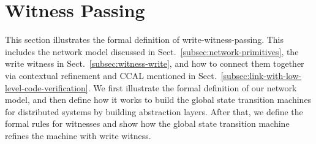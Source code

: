 \section{Witness Passing}
\label{sec:witness-passing-semantics}

This section illustrates the formal definition of write-witness-passing.
This includes
the network model discussed in Sect.~\ref{subsec:network-primitives}, 
the write witness in Sect.~\ref{subsec:witness-write}, and 
how to connect them together via contextual refinement and CCAL mentioned in Sect.~\ref{subsec:link-with-low-level-code-verification}.
We first illustrate the formal definition of our network model,  and then define how it works to 
build the global state transition machines for distributed systems by
building abstraction layers.
After that, we define the formal rules for witnesses and show how the global state transition machine refines
the machine with write witness. 

\newcommand{\msg}{\mathrm{msg}}
\newcommand{\argus}{\mathrm{args}}
\newcommand{\packet}{\mathrm{pkt}}
\newcommand{\canrecv}{\mathrm{valid_{recv}}}
\newcommand{\getsrc}{\mathrm{getSrc}}
\newcommand{\getowner}{\mathrm{getOwner}}
\newcommand{\getdes}{\mathrm{getDes}}
\newcommand{\checkcidone}{{\mathrm{checkCid}_1}}
\newcommand{\checkcidtwo}{{\mathrm{checkCid}_2}}
\newcommand{\lstate}[1]{\mathrm{lst}_{#1}}
\newcommand{\stfori}[1]{\mathrm{st}_{#1}}
\newcommand{\fsendpkt}[4]{[{#1}.\mathrm{SEND}\langle{#2}\rangle{[#3]}.{#4}]}
\newcommand{\frecvpkt}[4]{[{#1}.\mathrm{RECV}\langle{#2}\rangle{[#3]}.{#4}]}
\newcommand{\ftimeoutpkt}[2]{[{#1}.\mathrm{TOUT}\langle{#2}\rangle]}
\newcommand{\fghostpkt}[3]{[{#1}.\mathrm{GHOST}\langle{#2}\rangle[{#3}]]}
\newcommand{\networklog}{\mathrm{l}_{net}}
\newcommand{\layerfori}[1]{L{[#1]}}
\renewcommand{\replay}{\mathbb{R}}
\newcommand{\accsset}{\mathrm{ASET}}
\newcommand{\propsset}{\mathrm{PSET}}
\newcommand{\propkwd}{\mathrm{PROP}}
\newcommand{\dsset}{\mathrm{DSET}}
\newcommand{\getcid}{{\mathrm{getCid}}}

